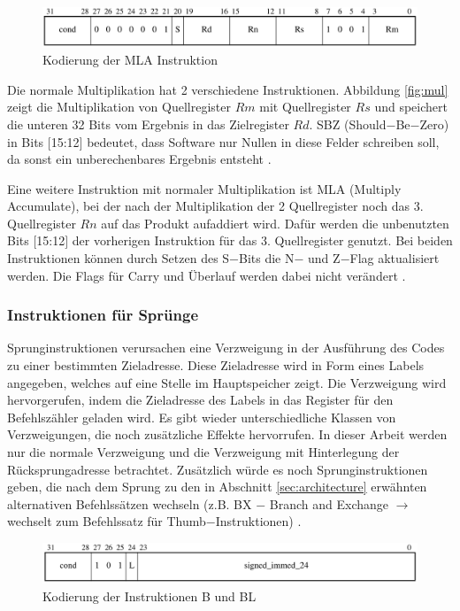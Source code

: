 \documentclass[a4paper, 11pt, onecolumn]{article}
\begin{document}
\begin{figure}[!htb]
\centering
\includegraphics[width=1\textwidth]{data/mla}
\caption[Kodierung MLA]{Kodierung der MLA Instruktion \cite{arm:2005}}
\label{fig:mla}
\end{figure}
Die normale Multiplikation hat 2 verschiedene Instruktionen. Abbildung \ref{fig:mul} zeigt die Multiplikation von Quellregister $Rm$ mit Quellregister $Rs$ und speichert die unteren 32 Bits vom Ergebnis in das Zielregister $Rd$. SBZ (Should$-$Be$-$Zero) in Bits $[$15:12$]$ bedeutet, dass Software nur Nullen in diese Felder schreiben soll, da sonst ein unberechenbares Ergebnis entsteht \cite{arm:2005}.


Eine weitere Instruktion mit normaler Multiplikation ist MLA (Multiply Accumulate), bei der nach der Multiplikation der 2 Quellregister noch das 3. Quellregister $Rn$ auf das Produkt aufaddiert wird. Dafür werden die unbenutzten Bits $[$15:12$]$ der vorherigen Instruktion für das 3. Quellregister genutzt. Bei beiden Instruktionen können durch Setzen des S$-$Bits die N$-$ und Z$-$Flag aktualisiert werden. Die Flags für Carry und Überlauf werden dabei nicht verändert \cite{arm:2005}.

\subsubsection{Instruktionen für Sprünge}

Sprunginstruktionen verursachen eine Verzweigung in der Ausführung des Codes zu einer bestimmten Zieladresse. Diese Zieladresse wird in Form eines Labels angegeben, welches auf eine Stelle im Hauptspeicher zeigt. Die Verzweigung wird hervorgerufen, indem die Zieladresse des Labels in das Register für den Befehlszähler geladen wird. Es gibt wieder unterschiedliche Klassen von Verzweigungen, die noch zusätzliche Effekte hervorrufen. In dieser Arbeit werden nur die normale Verzweigung und die Verzweigung mit Hinterlegung der Rücksprungadresse betrachtet. Zusätzlich würde es noch Sprunginstruktionen geben, die nach dem Sprung zu den in Abschnitt \ref{sec:architecture} erwähnten alternativen Befehlssätzen wechseln (z.B. BX $-$ Branch and Exchange $\rightarrow$ wechselt zum Befehlssatz für Thumb$-$Instruktionen) \cite{arm:2005}.

\begin{figure}[!htb]
\centering
\includegraphics[width=1\textwidth]{data/jump}
\caption[Kodierung B/BL]{Kodierung der Instruktionen B und BL \cite{arm:2005}}
\label{fig:jump}
\end{figure}
\end{document}
